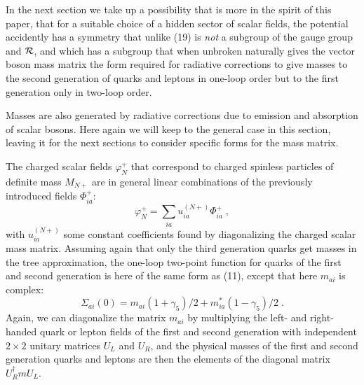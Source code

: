 In the next section we take up a possibility that is more in the spirit of this paper, that for a suitable choice of a hidden sector of scalar fields, the potential accidently has a symmetry that unlike (19) is {\em not} a subgroup of the gauge group and ${\cal R}$, and which  has a subgroup that when unbroken naturally gives the vector boson mass matrix  the form required for radiative corrections to give masses to the second generation of quarks and leptons in one-loop order but to the first generation only in two-loop order.


Masses are also generated by radiative corrections due to emission and absorption of scalar bosons.  Here again we will keep to the general case in this section, leaving it for the next sections to consider specific forms for the mass matrix.

The charged scalar fields $\varphi_N^+$ that correspond to charged spinless particles of definite mass $M_{N+}$ are in general linear combinations of the previously introduced fields $\Phi_{ia}^+$:
\begin{equation}
\varphi^+_N=\sum_{ia} u^{(N+)}_{ia}\Phi^+_{ia}\;,
\end{equation}
with $u^{(N+)}_{ia}$ some constant coefficients found by diagonalizing the charged scalar mass matrix.  
Assuming again that only the third generation quarks get masses in the tree approximation, the one-loop two-point function  for quarks of the first and second generation is here of the same form as (11), except that here $m_{ai}$ is  complex:
\begin{equation}
\Sigma_{ai}(0)=m_{ai}(1+\gamma_5)/2+m^*_{ia}(1-\gamma_5)/2 \;.
\end{equation}
Again, we can diagonalize the matrix $m_{ai}$    by multiplying  the left- and right-handed quark or lepton fields of the first and second generation with independent $2\times 2$  unitary matrices $U_L$ and $U_R$, and  the physical masses of the first and second generation quarks and leptons are then the  elements of the diagonal matrix $U_R^\dagger m U_L$.

